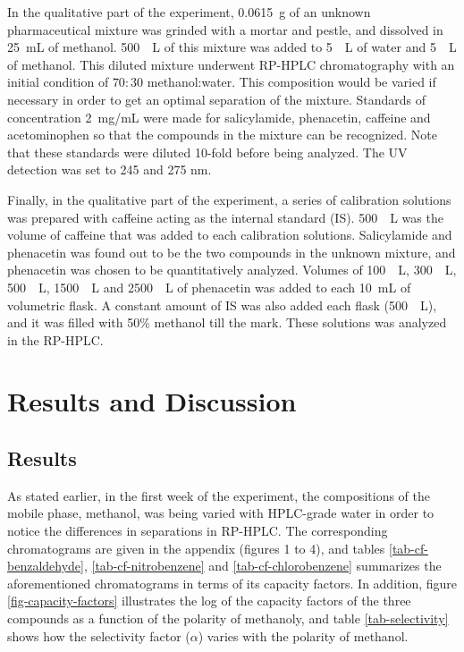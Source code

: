 \documentclass[a4paper, 12pt]{article}
\begin{document}
In the qualitative part of the experiment, \SI{0.0615}{g} of an unknown pharmaceutical mixture was grinded with a mortar and pestle, and dissolved in \SI{25}{mL} of methanol. \SI{500}{\mu{}L} of this mixture was added to \SI{5}{\mu{}L} of water and \SI{5}{\mu{}L} of methanol. This diluted mixture underwent RP-HPLC chromatography with an initial condition of $70:30$ methanol:water. This composition would be varied if necessary in order to get an optimal separation of the mixture. Standards of concentration \SI{2}{mg/mL} were made for salicylamide, phenacetin, caffeine and acetominophen so that the compounds in the mixture can be recognized. Note that these standards were diluted \num{10}-fold before being analyzed. The UV detection was set to \num{245} and \num{275} \si{nm}.

Finally, in the qualitative part of the experiment, a series of calibration solutions was prepared with caffeine acting as the internal standard (IS). \SI{500}{\mu{}L} was the volume of caffeine that was added to each calibration solutions. Salicylamide and phenacetin was found out to be the two compounds in the unknown mixture, and phenacetin was chosen to be quantitatively analyzed. Volumes of \SI{100}{\mu{}L}, \SI{300}{\mu{}L}, \SI{500}{\mu{}L}, \SI{1500}{\mu{}L} and \SI{2500}{\mu{}L} of phenacetin was added to each \SI{10}{mL} of volumetric flask. A constant amount of IS was also added each flask (\SI{500}{\mu{}L}), and it was filled with 50\% methanol till the mark. These solutions was analyzed in the RP-HPLC.


\section{Results and Discussion}

\subsection{Results}
As stated earlier, in the first week of the experiment, the compositions of the mobile phase, methanol, was being varied with HPLC-grade water in order to notice the differences in separations in RP-HPLC. The corresponding chromatograms are given in the appendix (figures 1 to 4), and tables \ref{tab-cf-benzaldehyde}, \ref{tab-cf-nitrobenzene} and \ref{tab-cf-chlorobenzene} summarizes the aforementioned chromatograms in terms of its capacity factors. In addition, figure \ref{fig-capacity-factors} illustrates the log of the capacity factors of the three compounds as a function of the polarity of methanoly, and table \ref{tab-selectivity} shows how the selectivity factor ($\alpha$) varies with the polarity of methanol.
\end{document}
